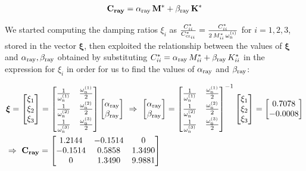 \documentclass[a4paper,12pt,oneside]{article}
\begin{document}
\[
	\mathbf{C_{ray}} =
		\alpha_\textup{ray} \, \mathbf{M^*} + \beta_\textup{ray} \, \mathbf{K^*}
\]

We started computing the damping ratios $ \xi_i $ as $ \frac{C^*_{ii}}{C^*_{\textup{cr}_{ii}}} = \frac{C^*_{ii}}{2 \, M^*_{ii} \, \omega_\textup{n}^{(i)}} $ for $ i = 1, 2, 3 $, stored in the vector $ \bm{\xi} $, then exploited the relationship between the values of $ \bm{\xi} $ and $ \alpha_\textup{ray}, \beta_\textup{ray} $ obtained by substituting $ C^*_{ii} = \alpha_\textup{ray} \, M^*_{ii} + \beta_\textup{ray} \, K^*_{ii} $ in the expression for $ \xi_i $ in order for us to find the values of $ \alpha_\textup{ray} $ and $ \beta_\textup{ray} $:

\[ \begin{split}
	& \bm{\xi} =	\begin{bmatrix}
									\xi_1 \\
									\xi_2 \\
									\xi_3
								\end{bmatrix} =
		\begin{bmatrix}
		 	\frac{1}{\omega_\textup{n}^{(1)}}	& \frac{\omega_\textup{n}^{(1)}}{2} \\
			\frac{1}{\omega_\textup{n}^{(2)}}	& \frac{\omega_\textup{n}^{(2)}}{2} \\
			\frac{1}{\omega_\textup{n}^{(3)}}	& \frac{\omega_\textup{n}^{(3)}}{2}
		\end{bmatrix} \begin{bmatrix}
										\alpha_\textup{ray} \\
										\beta_\textup{ray}
									\end{bmatrix} ~ \Rightarrow ~
		\begin{bmatrix}
			\alpha_\textup{ray} \\
			\beta_\textup{ray}
		\end{bmatrix} =
		\begin{bmatrix}
			\frac{1}{\omega_\textup{n}^{(1)}}	& \frac{\omega_\textup{n}^{(1)}}{2} \\
			\frac{1}{\omega_\textup{n}^{(2)}}	& \frac{\omega_\textup{n}^{(2)}}{2} \\
			\frac{1}{\omega_\textup{n}^{(3)}}	& \frac{\omega_\textup{n}^{(3)}}{2}
		\end{bmatrix}^{-1}	\begin{bmatrix}
													\xi_1 \\
													\xi_2 \\
													\xi_3
												\end{bmatrix} = \begin{bmatrix}
																					0.7078 \\
																					-0.0008
																				\end{bmatrix} \\
	& \Rightarrow ~ \mathbf{C_{ray}} =	\begin{bmatrix}
																				1.2144	& -0.1514	& 0 \\
																				-0.1514	& 0.5858	& 1.3490 \\
																				0				& 1.3490	& 9.9881
																			\end{bmatrix}
\end{split} \]
\end{document}
